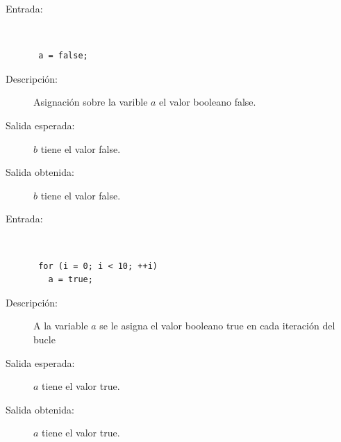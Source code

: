 \begin{framed}
	\begin{description}
		\item [Entrada:] \hfill \\
\begin{lstlisting}
 a = false;
\end{lstlisting}
		\item [Descripción:] Asignación sobre la varible $a$ el valor booleano false.
		\item [Salida esperada:] $b$ tiene el valor false.
		\item [Salida obtenida:] $b$ tiene el valor false.
	\end{description}
\end{framed}

\begin{framed}
	\begin{description}
		\item [Entrada:] \hfill \\
\begin{lstlisting}
 for (i = 0; i < 10; ++i) 
   a = true;
\end{lstlisting}
		\item [Descripción:] A la variable $a$ se le asigna el valor booleano true en cada iteración del bucle
		\item [Salida esperada:] $a$ tiene el valor true.
		\item [Salida obtenida:] $a$ tiene el valor true.
	\end{description}
\end{framed}

